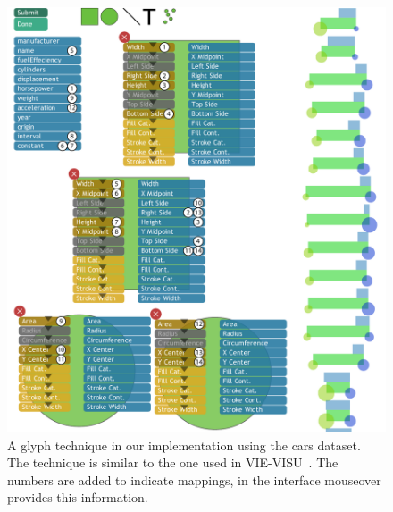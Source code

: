 \begin{figure}[t]
\centering
\includegraphics[width=.5\columnwidth]{images/cars.pdf}
\caption{
A glyph technique in our implementation using the cars dataset. The technique is similar to the one used in VIE-VISU~\cite{Horn1998}.
The numbers are added to indicate mappings, in the interface mouseover provides this information.
}
\label{fig:cars}
\end{figure}